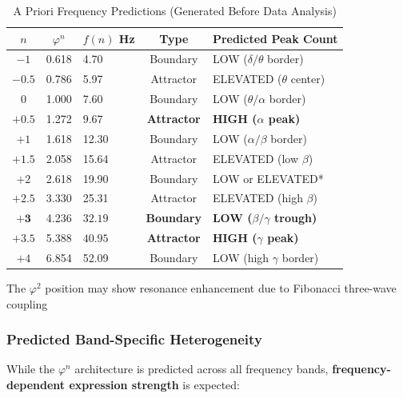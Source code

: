 \documentclass[11pt,a4paper]{article}
\newcommand{\phisym}{\varphi}
\begin{document}
\begin{table}[H]
\centering
\caption{A Priori Frequency Predictions (Generated Before Data Analysis)}
\label{tab:predictions}
\begin{tabular}{@{}cclcl@{}}
\toprule
$n$ & $\phisym^n$ & $f(n)$ Hz & Type & Predicted Peak Count \\
\midrule
$-1$ & 0.618 & 4.70 & Boundary & LOW ($\delta/\theta$ border) \\
$-0.5$ & 0.786 & 5.97 & Attractor & ELEVATED ($\theta$ center) \\
$0$ & 1.000 & 7.60 & Boundary & LOW ($\theta/\alpha$ border) \\
$\mathbf{+0.5}$ & 1.272 & $\mathbf{9.67}$ & \textbf{Attractor} & \textbf{HIGH ($\alpha$ peak)} \\
$+1$ & 1.618 & 12.30 & Boundary & LOW ($\alpha/\beta$ border) \\
$+1.5$ & 2.058 & 15.64 & Attractor & ELEVATED (low $\beta$) \\
$+2$ & 2.618 & 19.90 & Boundary & LOW or ELEVATED* \\
$+2.5$ & 3.330 & 25.31 & Attractor & ELEVATED (high $\beta$) \\
$\mathbf{+3}$ & 4.236 & $\mathbf{32.19}$ & \textbf{Boundary} & \textbf{LOW ($\beta/\gamma$ trough)} \\
$\mathbf{+3.5}$ & 5.388 & $\mathbf{40.95}$ & \textbf{Attractor} & \textbf{HIGH ($\gamma$ peak)} \\
$+4$ & 6.854 & 52.09 & Boundary & LOW (high $\gamma$ border) \\
\bottomrule
\end{tabular}
\begin{tablenotes}
\small
\item *The $\phisym^2$ position may show resonance enhancement due to Fibonacci three-wave coupling
\end{tablenotes}
\end{table}

\subsubsection{Predicted Band-Specific Heterogeneity}

While the $\phisym^n$ architecture is predicted across all frequency bands, \textbf{frequency-dependent expression strength} is expected:
\end{document}
